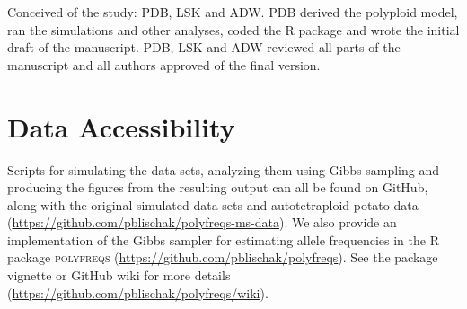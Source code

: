 \documentclass[11pt,english,letterpaper,oneside]{article}
\begin{document}
Conceived of the study: PDB, LSK and ADW. PDB derived the polyploid model, ran the simulations and other analyses, coded the R package and wrote the initial draft of the manuscript. PDB, LSK and ADW reviewed all parts of the manuscript and all authors approved of the final version.
\medskip

\section{Data Accessibility}            %

Scripts for simulating the data sets, analyzing them using Gibbs sampling and producing the figures from the resulting output can all be found on GitHub, along with the original simulated data sets and autotetraploid potato data (\url{https://github.com/pblischak/polyfreqs-ms-data}). We also provide an implementation of the Gibbs sampler for estimating allele frequencies in the R package \textsc{polyfreqs} (\url{https://github.com/pblischak/polyfreqs}). See the package vignette or GitHub wiki for more details (\url{https://github.com/pblischak/polyfreqs/wiki}).
\newpage

\end{document}
